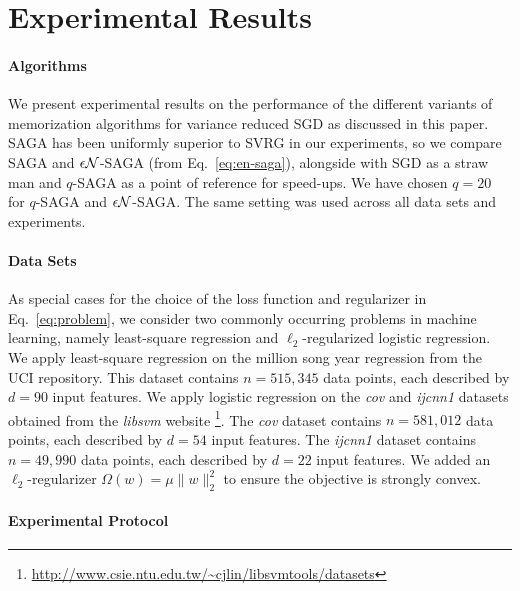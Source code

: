 \section{Experimental Results}
\label{section:results}

\paragraph{Algorithms} We present experimental results on the performance of the different variants of memorization algorithms for variance reduced SGD as discussed in this paper. SAGA has been uniformly superior to SVRG in our experiments, so we compare SAGA and $\epsilon {\cal N}$-SAGA (from Eq.~\eqref{eq:en-saga}), alongside with SGD as a straw man and $q$-SAGA as a point of reference for speed-ups. We have chosen $q=20$ for $q$-SAGA and $\epsilon {\cal N}$-SAGA. The same setting was used across all data sets and experiments. 


\paragraph{Data Sets}

As special cases for the choice of the loss function and regularizer in Eq.~\eqref{eq:problem}, we consider two commonly occurring problems in machine learning, namely least-square regression and $\ell_2$-regularized logistic regression.
%
We apply least-square regression on the million song year regression from the UCI repository. This dataset contains $n = 515,345$ data points, each described by $d=90$ input features.
%
We apply logistic regression on the {\it cov} and {\it ijcnn1} datasets obtained from the {\it libsvm} website
\footnote{\url{http://www.csie.ntu.edu.tw/~cjlin/libsvmtools/datasets}}. The
         {\it cov} dataset contains $n = 581,012$ data points, each
         described by $d = 54$ input features. The {\it ijcnn1}
         dataset contains $n = 49,990$ data points, each described by
         $d = 22$ input features.
%
We added an $\ell_2$-regularizer $\Omega(w) = \mu \|w\|_2^2$ to ensure
the objective is strongly convex.

\paragraph{Experimental Protocol}

